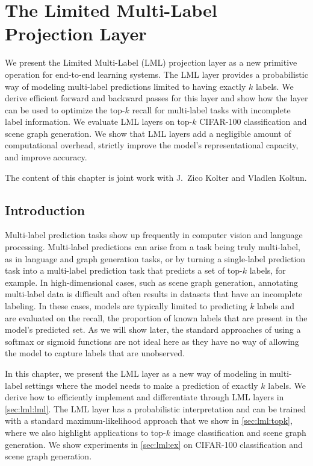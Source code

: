\graphicspath{{lml-images/}}

\chapter{The Limited Multi-Label Projection Layer}
\label{sec:lml}

We present the Limited Multi-Label (LML) projection layer as a
new primitive operation for end-to-end learning systems.
The LML layer provides a probabilistic way of modeling
multi-label predictions limited to having exactly $k$ labels.
We derive efficient forward and backward passes for this layer
and show how the layer can be used to optimize the top-$k$
recall for multi-label tasks with incomplete label information.
We evaluate LML layers on top-$k$ CIFAR-100 classification and
scene graph generation. We show that LML layers add a negligible
amount of computational overhead, strictly improve the
model's representational capacity, and improve accuracy.

The content of this chapter is joint work with
J.~Zico Kolter and Vladlen Koltun.

\section{Introduction}
Multi-label prediction tasks show up frequently
in computer vision and language processing.
Multi-label predictions can arise from a task being truly
multi-label, as in language and graph generation tasks,
or by turning a single-label prediction task into a multi-label
prediction task that predicts a set of top-$k$ labels,
for example.
In high-dimensional cases, such as scene graph generation,
annotating multi-label data is difficult and often results
in datasets that have an incomplete labeling.
In these cases, models are typically limited to predicting
$k$ labels and are evaluated on the recall,
the proportion of known labels that are present in
the model's predicted set.
As we will show later, the standard approaches of using
a softmax or sigmoid functions
are not ideal here as they have no way of allowing the model
to capture labels that are unobserved.

In this chapter, we present the LML layer as a new way of
modeling in multi-label settings where the model needs to make a
prediction of exactly $k$ labels.
We derive how to efficiently implement and differentiate
through LML layers in \cref{sec:lml:lml}.
The LML layer has a probabilistic interpretation and can be
trained with a standard maximum-likelihood approach
that we show in \cref{sec:lml:topk}, where we also
highlight applications to top-$k$ image classification
and scene graph generation.
We show experiments in \cref{sec:lml:ex} on
\mbox{CIFAR-100} classification and
scene graph generation.

